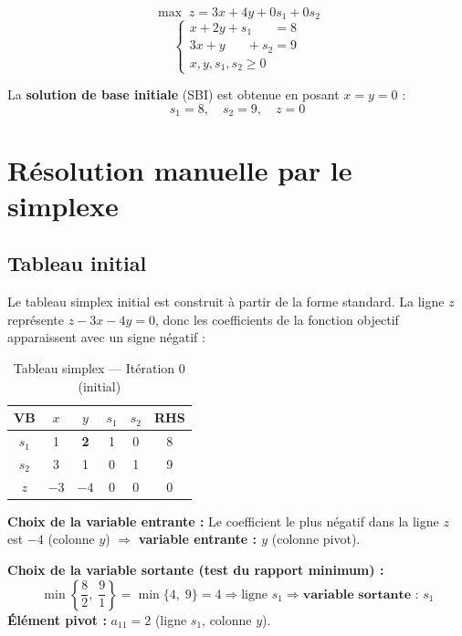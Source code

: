 \documentclass[12pt,a4paper]{article}
\begin{document}
\[
  \max \; z = 3x + 4y + 0s_1 + 0s_2
\]
\[
  \begin{cases}
    x + 2y + s_1 \phantom{+ s_2} = 8 \\
    3x + y \phantom{+ s_1} + s_2 = 9 \\
    x, y, s_1, s_2 \geq 0
  \end{cases}
\]

La \textbf{solution de base initiale} (SBI) est obtenue en posant $x = y = 0$ :
\[
  s_1 = 8, \quad s_2 = 9, \quad z = 0
\]

\section{Résolution manuelle par le simplexe}

\subsection{Tableau initial}

Le tableau simplex initial est construit à partir de la forme standard. 
La ligne $z$ représente $z - 3x - 4y = 0$, donc les coefficients de la 
fonction objectif apparaissent avec un signe négatif :

\begin{table}[H]
\centering
\caption{Tableau simplex — Itération 0 (initial)}
\begin{tabular}{c|cccc|c}
\toprule
\textbf{VB} & $x$ & $y$ & $s_1$ & $s_2$ & \textbf{RHS} \\
\midrule
$s_1$ & 1 & \textbf{2} & 1 & 0 & 8 \\
$s_2$ & 3 & 1 & 0 & 1 & 9 \\
\midrule
$z$   & $-3$ & $-4$ & 0 & 0 & 0 \\
\bottomrule
\end{tabular}
\end{table}

\textbf{Choix de la variable entrante :} Le coefficient le plus négatif 
dans la ligne $z$ est $-4$ (colonne $y$) $\Rightarrow$ \textbf{variable 
entrante : $y$} (colonne pivot).

\textbf{Choix de la variable sortante (test du rapport minimum) :}
\[
  \min\left\{\frac{8}{2},\; \frac{9}{1}\right\} = \min\{4,\; 9\} = 4 
  \Rightarrow \text{ligne } s_1 \Rightarrow \textbf{variable sortante : } s_1
\]
\textbf{Élément pivot : } $a_{11} = 2$ (ligne $s_1$, colonne $y$).
\end{document}
